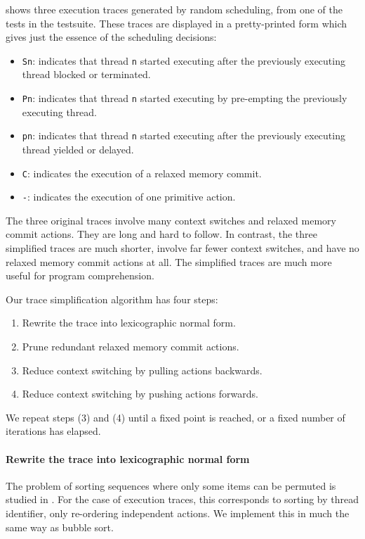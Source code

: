  shows three execution traces generated
by random scheduling, from one of the tests in the \dejafu{}
testsuite.  These traces are displayed in a pretty-printed form which
gives just the essence of the scheduling decisions:

\begin{itemize}
\item \verb|Sn|: indicates that thread \verb|n| started executing
  after the previously executing thread blocked or terminated.
\item \verb|Pn|: indicates that thread \verb|n| started executing by
  pre-empting the previously executing thread.
\item \verb|pn|: indicates that thread \verb|n| started executing
  after the previously executing thread yielded or delayed.
\item \verb|C|: indicates the execution of a relaxed memory commit.
\item \verb|-|: indicates the execution of one primitive action.
\end{itemize}

The three original traces involve many context
switches and relaxed memory commit actions.  They are long and hard to
follow.  In contrast, the three simplified traces are much shorter,
involve far fewer context switches, and have no relaxed memory commit
actions at all.  The simplified traces are much more useful for
program comprehension.

Our trace simplification algorithm has four steps:

\begin{enumerate}
\item Rewrite the trace into lexicographic normal form.
\item Prune redundant relaxed memory commit actions.
\item Reduce context switching by pulling actions backwards.
\item Reduce context switching by pushing actions forwards.
\end{enumerate}

We repeat steps (3) and (4) until a fixed point is reached, or a fixed
number of iterations has elapsed.

\paragraph{Rewrite the trace into lexicographic normal form}
The problem of sorting sequences where only some items can be permuted
is studied in \cite{anisimov1979}.  For the case of execution traces,
this corresponds to sorting by thread identifier, only re-ordering
independent actions.  We implement this in much the same way as bubble
sort.

